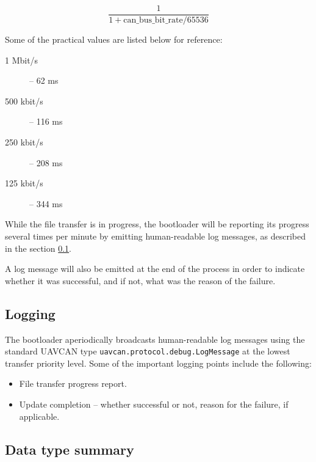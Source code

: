 \documentclass{zubaxdoc}
\begin{document}
$$\frac{1}{1 + {\text{can{\_}bus{\_}bit{\_}rate}}/{65536}}$$

Some of the practical values are listed below for reference:
\begin{description}
    \item[1 Mbit/s] -- 62 ms
    \item[500 kbit/s] -- 116 ms
    \item[250 kbit/s] -- 208 ms
    \item[125 kbit/s] -- 344 ms
\end{description}

While the file transfer is in progress,
the bootloader will be reporting its progress several times per minute
by emitting human-readable log messages,
as described in the section \ref{sec:uavcan_bootloader_logging}.

A log message will also be emitted at the end of the process in order to indicate whether it was successful,
and if not, what was the reason of the failure.

\subsection{Logging}\label{sec:uavcan_bootloader_logging}

The bootloader aperiodically broadcasts human-readable log messages using the standard UAVCAN type
\verb|uavcan.protocol.debug.LogMessage| at the lowest transfer priority level.
Some of the important logging points include the following:
\begin{itemize}
    \item File transfer progress report.
    \item Update completion -- whether successful or not, reason for the failure, if applicable.
\end{itemize}

\subsection{Data type summary}
\end{document}

